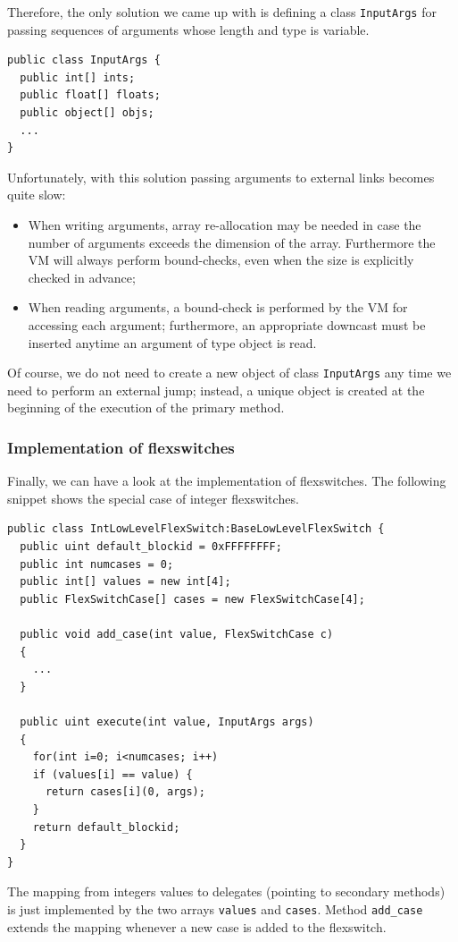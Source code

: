 Therefore, the only solution we came up with is defining a class
\lstinline{InputArgs} for passing sequences of arguments whose length
and type is variable.
\begin{small}
\begin{lstlisting}[language={[Sharp]C}] 
public class InputArgs {
  public int[] ints;
  public float[] floats;
  public object[] objs;
  ...
}
\end{lstlisting}
\end{small}
Unfortunately, with this solution passing arguments to external links
becomes quite slow:
\begin{itemize}
\item When writing arguments, array re-allocation may be needed in
  case the number of arguments exceeds the dimension of the
  array. Furthermore the VM will always perform bound-checks, even
  when the size is explicitly checked in advance;

\item When reading arguments, a bound-check is performed by the VM for
  accessing each argument; furthermore, an appropriate downcast must be
  inserted anytime an argument of type object is read.
\end{itemize}
Of course, we do not need to create a new object of class
\lstinline{InputArgs} any time we need to perform an external jump;
instead, a unique object is created at the beginning of the execution
of the primary method. 

\subsubsection{Implementation of flexswitches}
Finally, we can have a look at the implementation of flexswitches.
The following snippet shows the special case of integer flexswitches.
\begin{small}
\begin{lstlisting}[language={[Sharp]C}] 
public class IntLowLevelFlexSwitch:BaseLowLevelFlexSwitch {
  public uint default_blockid = 0xFFFFFFFF;
  public int numcases = 0;
  public int[] values = new int[4];
  public FlexSwitchCase[] cases = new FlexSwitchCase[4];

  public void add_case(int value, FlexSwitchCase c)
  {
    ...
  }

  public uint execute(int value, InputArgs args)
  {
    for(int i=0; i<numcases; i++)
    if (values[i] == value) {
      return cases[i](0, args);
    }
    return default_blockid;
  }
}
\end{lstlisting}
\end{small}
The mapping from integers values to delegates (pointing to secondary
methods) is just implemented by the two arrays \lstinline{values} and
\lstinline{cases}. Method \lstinline{add_case} extends the mapping
whenever a new case is added to the flexswitch.
  
